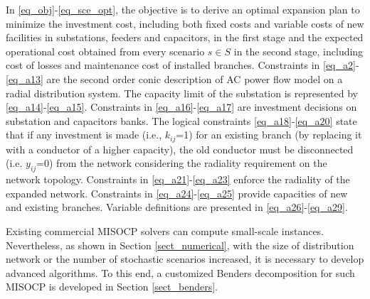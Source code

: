 \documentclass[journal]{IEEEtran}
\theoremstyle{remark}
\begin{document}
In \eqref{eq_obj}-\eqref{eq_sce_opt}, the objective is to derive an optimal expansion plan to minimize the investment cost, including both fixed costs and variable costs of new facilities in
 substations, feeders and capacitors, in the first stage and the expected operational cost obtained from every scenario $s\in S$ in the second stage, including cost of losses and  maintenance cost of installed  branches. Constraints in \eqref{eq_a2}-\eqref{eq_a13} are the second order conic description of AC power flow model on a radial distribution system. The capacity limit of the substation is represented by \eqref{eq_a14}-\eqref{eq_a15}. Constraints in \eqref{eq_a16}-\eqref{eq_a17} are investment decisions on substation and capacitors banks.
 The logical constraints \eqref{eq_a18}-\eqref{eq_a20} state that if any investment is made (i.e., $k_{ij}$=1) for an existing branch (by replacing it with a conductor of a higher capacity), the old  conductor must be disconnected (i.e. $y_{ij}$=0) from the network  considering the radiality requirement on the network topology.  Constraints in \eqref{eq_a21}-\eqref{eq_a23} enforce the radiality of the expanded network. Constraints in \eqref{eq_a24}-\eqref{eq_a25} provide capacities of new and existing branches. Variable definitions are presented in \eqref{eq_a26}-\eqref{eq_a29}.

Existing commercial MISOCP solvers can compute small-scale instances. Nevertheless, as shown in Section \ref{sect_numerical}, with the size of distribution network or the number of stochastic scenarios increased, it is necessary to develop advanced algorithms. To this end, a customized Benders decomposition for such MISOCP is developed in Section \ref{sect_benders}.
\end{document}

